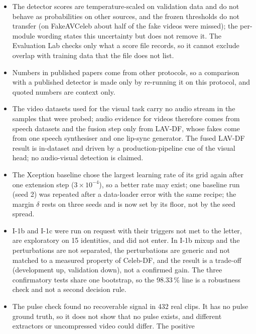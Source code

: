 \documentclass[conference,a4paper]{IEEEtran_nodash}
\begin{document}
\begin{itemize}
        CLIP and WavLM) have conditional licences that are accepted here as
        research-only; this restricts reuse of the checkpoints.
  \item The detector scores are temperature-scaled on validation data and do not
        behave as probabilities on other sources, and the frozen thresholds do
        not transfer (on FakeAVCeleb about half of the fake videos were missed);
        the per-module wording states this uncertainty but does not remove it.
        The Evaluation Lab checks only what a score file records, so it cannot
        exclude overlap with training data that the file does not list. %
  \item Numbers in published papers come from other protocols, so a comparison
        with a published detector is made only by re-running it on this
        protocol, and quoted numbers are context only.
  \item The video datasets used for the visual task carry no audio stream in
        the samples that were probed; audio evidence for videos therefore comes
        from speech datasets and the fusion step only from LAV-DF, whose fakes
        come from one speech synthesiser and one lip-sync generator. The fused
        LAV-DF result is in-dataset and driven by a production-pipeline cue of
        the visual head; no audio-visual detection is claimed.
  \item The Xception baseline chose the largest learning rate of its grid
        again after one extension step ($3\times10^{-4}$), so a better rate may
        exist; one baseline run (seed 2) was repeated after a data-loader error with the same
        recipe; the margin $\delta$ rests on three seeds and is now set by its
        floor, not by the seed spread.
  \item I-1b and I-1c were run on request with their triggers not met to the
        letter, are exploratory on 15 identities, and did not enter. In I-1b
        mixup and the perturbations are not separated, the perturbations are
        generic and not matched to a measured property of Celeb-DF, and the
        result is a trade-off (development up, validation down), not a
        confirmed gain. The three confirmatory tests share one bootstrap, so the
        98.33\,\% line is a robustness check and not a second decision rule.
  \item The pulse check found no recoverable signal in 432 real clips. It has no
        pulse ground truth, so it does not show that no pulse exists, and
        different extractors or uncompressed video could differ. The positive

\end{itemize}
\end{document}

